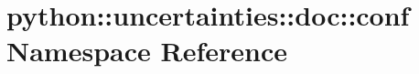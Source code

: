 \hypertarget{namespacepython_1_1uncertainties_1_1doc_1_1conf}{
\section{python::uncertainties::doc::conf Namespace Reference}
\label{namespacepython_1_1uncertainties_1_1doc_1_1conf}
}
